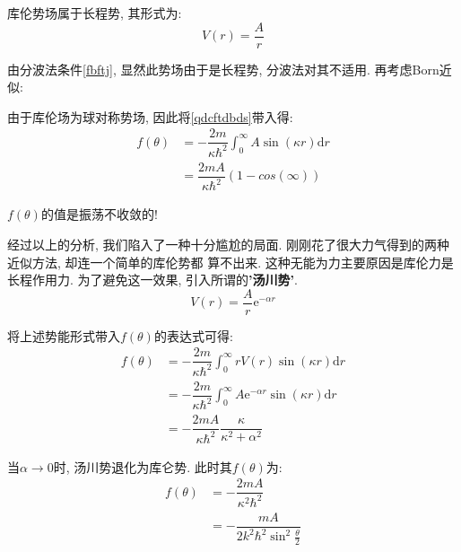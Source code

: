 \documentclass[a4paper, 11pt]{article}
\begin{document}
\begin{spacing}{1.2}
          库伦势场属于长程势, 其形式为:
          \begin{equation}
            V(r) = \dfrac{A}{r}
          \end{equation}

          由分波法条件\eqref{fbftj}, 显然此势场由于是长程势, 分波法对其不适用. 再考虑Born近似:
          
          由于库伦场为球对称势场, 因此将\eqref{qdcftdbds}带入得:
          \begin{equation}
            \begin{aligned}
              f(\theta) &= -\dfrac{2m}{\kappa\hbar^2}\int_0^{\infty}A\sin(\kappa{}r)\mathrm{d}r\\
                        &= \dfrac{2mA}{\kappa\hbar^2}(1-cos(\infty))
            \end{aligned}
          \end{equation}

          $f(\theta)$的值是振荡不收敛的!

          经过以上的分析, 我们陷入了一种十分尴尬的局面. 刚刚花了很大力气得到的两种近似方法, 却连一个简单的库伦势都
          算不出来. 这种无能为力主要原因是库伦力是长程作用力. 为了避免这一效果, 引入所谓的\textbf{'汤川势'}. 
          \begin{equation}
            V(r) = \dfrac{A}{r}\mathrm{e}^{-\alpha{}r}
          \end{equation}

          将上述势能形式带入$f(\theta)$的表达式可得:
          \begin{equation}
            \begin{aligned}
              f(\theta) &= -\dfrac{2m}{\kappa\hbar^2}\int_0^{\infty}rV(r)\sin(\kappa{}r)\mathrm{d}r\\
                        &= -\dfrac{2m}{\kappa\hbar^2}\int_0^{\infty}A\mathrm{e}^{-\alpha{}r}\sin(\kappa{}r)\mathrm{d}r\\
                        &= -\dfrac{2mA}{\kappa\hbar^2}\dfrac{\kappa}{\kappa^2+\alpha^2}
            \end{aligned}
          \end{equation}

          当$\alpha\to0$时, 汤川势退化为库仑势. 此时其$f(\theta)$为:
          \begin{equation}
            \begin{aligned}
              f(\theta) &= -\dfrac{2mA}{\kappa^2\hbar^2}\\
                        &= -\dfrac{mA}{2k^2\hbar^2\sin^2\frac{\theta}{2}}
            \end{aligned}
          \end{equation}


\end{spacing}
\end{document}
